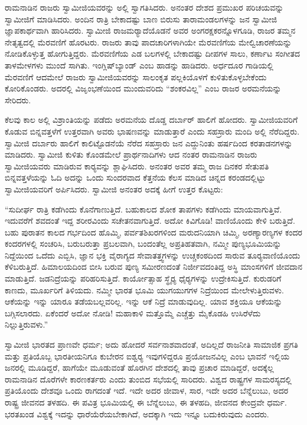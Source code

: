  ರಾಮನಾಡಿನ ರಾಜರು ಸ್ವಾಮೀಜಿಯವರನ್ನು ಅಲ್ಲಿ ಸ್ವಾಗತಿಸಿದರು. ಅನಂತರ ದೇಶದ ಪ್ರಮುಖರ ಪರಿಚಯವನ್ನು ಸ್ವಾಮೀಜಿಗೆ ಮಾಡಿಸಿದರು. ಅಂದಿನ ರಾತ್ರಿ ಬೇಕಾದಷ್ಟು ಬಾಣ ಬಿರುಸು ತಾರಾಮಂಡಲಗಳನ್ನು ಜನ ಸ್ವಾಮೀಜಿ ಜ್ಞಾಪಕಾರ್ಥವಾಗಿ ಹಾರಿಸಿದರು. ಸ್ವಾಮೀಜಿ ರಾಜಮರ‍್ಯಾದೆಯೊಡನೆ ಅವರ ಅಂಗರಕ್ಷಕರನ್ನೊಳಗೂಡಿ, ರಾಜರ ತಮ್ಮನ ನೇತೃತ್ವದಲ್ಲಿ ಮೆರವಣಿಗೆ ಹೊರಟರು. ರಾಜರು ತಾವು ಪಾದಚಾರಿಗಳಾಗಿಯೇ ಮೆರವಣಿಗೆಯ ಮೇಲ್ವಿಚಾರಣೆಯನ್ನು ನೋಡಿಕೊಳ್ಳುತ್ತ ಹೋಗುತ್ತಿದ್ದರು. ಮೆರವಣಿಗೆಯ ಎಡ ಬಲಗಳಲ್ಲಿ ಬೇಕಾದಷ್ಟು ದೀಪಗಳ ಸಾಲು, ಕರ್ಣಾಟ ಸಂಗೀತದ ತಾಳಮೇಳಗಳು ಮುಂದೆ ಸಾಗಿತು. ಇಂಗ್ಲಿಷ್‌ಬ್ಯಾಂಡ್  ಎಂಬ ಹಾಡನ್ನು ಹಾಡಿದರು. ಅರ್ಧದೂರ ಗಾಡಿಯಲ್ಲಿ ಮೆರವಣಿಗೆ ಆದಮೇಲೆ ರಾಜರು ಸ್ವಾಮೀಜಿಯವರನ್ನು ಸಾಲಂಕೃತ ಪಲ್ಲಕಿಯೊಳಗೆ ಕುಳಿತುಕೊಳ್ಳಬೇಕೆಂದು ಕೋರಿಕೊಂಡರು. ಅದರಲ್ಲಿ ವಿಜೃಂಭಣೆಯಿಂದ ಮುಂದುವರಿದು “ಶಂಕರವಿಲ್ಲ” ಎಂಬ ರಾಜರ ಅರಮನೆಯನ್ನು ಸೇರಿದರು. 

 ಕೆಲವು ಕಾಲ ಅಲ್ಲಿ ವಿಶ್ರಾಂತಿಯನ್ನು ಪಡೆದು ಅರಮನೆಯ ದೊಡ್ಡ ದರ್ಬಾರ್ ಹಾಲಿಗೆ ಹೋದರು. ಸ್ವಾಮೀಜಿಯವರಿಗೆ ಕೊಡುವ ಬಿನ್ನವತ್ತಳೆಗೆ ಉತ್ತರವಾಗಿ ಅವರು ಭಾಷಣವನ್ನು ಮಾಡುತ್ತಾರೆ ಎಂದು ಸಹಸ್ರಾರು ಮಂದಿ ಅಲ್ಲಿ ನೆರೆದಿದ್ದರು. ಸ್ವಾಮೀಜಿ ದರ್ಬಾರು ಹಾಲಿಗೆ ಕಾಲಿಟ್ಟೊಡನೆಯೆ ನೆರೆದ ಸಹಸ್ರಾರು ಜನ ಎದ್ದುನಿಂತು ಹರ್ಷದಿಂದ ಕರತಾಡನಗಳನ್ನು ಮಾಡಿದರು. ಸ್ವಾಮೀಜಿ ಕುಳಿತು ಕೊಂಡಮೇಲೆ ಪ್ರಾರ್ಥನಾದಿಗಳು ಆದ ನಂತರ ರಾಮನಾಡಿನ ರಾಜರು ಸ್ವಾಮೀಜಿಯವರು ಮಾಡಿರುವ ಕಾರ‍್ಯವನ್ನು ಶ್ಲಾಘಿಸಿದರು. ಅನಂತರ ಅವರ ತಮ್ಮ ರಾಜ ದಿನಕರ ಸೇತುಪತಿ ಬಿನ್ನವತ್ತಳೆಯನ್ನು ಓದಿ ಅದನ್ನು ಒಂದು ಸುಂದರವಾದ ಕೆತ್ತನೆಯ ಕೆಲಸ ಮಾಡಿದ ಚಿನ್ನದ ಕರಂಡದಲ್ಲಿಟ್ಟು ಸ್ವಾಮೀಜಿಯವರಿಗೆ ಅರ್ಪಿಸಿದರು. ಸ್ವಾಮೀಜಿ ಅನಂತರ ಅದಕ್ಕೆ ಹೀಗೆ ಉತ್ತರ ಕೊಟ್ಟರು: 

 “ಸುದೀರ್ಘ ರಾತ್ರಿ ಕಡೆಗಿಂದು ಕೊನೆಗಾಣುತ್ತಿದೆ. ಬಹುಕಾಲದ ಶೋಕ ತಾಪಗಳು ಕಡೆಗಿಂದು ಮಾಯವಾಗುತ್ತಿವೆ. ಇದುವರೆಗೆ ಶವದಂತೆ ಇದ್ದ ಶರೀರವಿಂದು ಸಚೇತನವಾಗುತ್ತಿದೆ. ಅದೋ ಕಿವಿಗೊಡಿ! ವಾಣಿಯೊಂದು ಕೇಳಿ ಬರುತ್ತಿದೆ. ಬಹು ಪುರಾತನ ಕಾಲದ ಗರ್ಭದಿಂದ ಹೊಮ್ಮಿ, ಪರ್ವತಶಿಖರಗಳಿಂದ ಮರುದನಿಯಾಗಿ ಚಿಮ್ಮಿ, ಅರಣ್ಯಾರಣ್ಯಗಳ ಕಂದರ ಕಂದರಗಳಲ್ಲಿ ಸಂಚರಿಸಿ, ಬರುಬರುತ್ತಾ ಪ್ರಬಲವಾಗಿ, ಬಂದಂತೆಲ್ಲ ಅಪ್ರತಿಹತವಾಗಿ, ನಮ್ಮೀ ಪುಣ್ಯಭೂಮಿಯನ್ನು ನಿದ್ದೆಯಿಂದ ಒದೆದು ಎಬ್ಬಿಸಿ, ಜ್ಞಾನ ಭಕ್ತಿ ವೈರಾಗ್ಯದ ಸೇವಾತತ್ತ್ವಗಳನ್ನು ಉಚ್ಚಕಂಠದಿಂದ ಸಾರುವ ತೂರ‍್ಯವಾಣಿಯೊಂದು ಕೆಳಿಬರುತ್ತಿದೆ. ಹಿಮಾಲಯದಿಂದ ಬೀಸಿ ಬರುವ ಪುಣ್ಯ ಸಮೀರಣದಂತೆ ನಿರ್ಜೀವದಂತಿದ್ದ ಅಸ್ಥಿ ಮಾಂಸಗಳಿಗೆ ಜೀವದಾನ ಮಾಡುತ್ತಿದೆ. ಜಡನಿದ್ರೆಯನ್ನು ಪರಿಹರಿಸುತ್ತಿದೆ. ಕಾರ್ಯೋತ್ಸಾಹ ಸ್ಥೈರ‍್ಯ ಧೈರ‍್ಯಗಳನ್ನು ಉದ್ರೇಕಿಸುತ್ತಿದೆ. ಕುರುಡರಿಗೆ ಕಾಣದು, ಮೂರ್ಖರಿಗೆ ತಿಳಿಯದು. ನಮ್ಮೀ ಭಾರತ ಭೂಮಿ ಯುಗಯುಗಗಳ ನಿದ್ರೆಯಿಂದ ಮೇಲೇಳುತ್ತಿರುವಳು. ಆಕೆಯನ್ನು ಇನ್ನು ಯಾರೂ ತಡೆಯಬಲ್ಲವರಿಲ್ಲ. ಇನ್ನು ಆಕೆ ನಿದ್ರೆ ಮಾಡುವುದಿಲ್ಲ. ಯಾವ ಶಕ್ತಿಯೂ ಆಕೆಯನ್ನು ಬಗ್ಗಿಸಲಾರದು. ಏಕೆಂದರೆ ಅದೋ ನೋಡಿ! ಮಹಾಕಾಳಿ ಮತ್ತೊಮ್ಮೆ ಎಚ್ಚೆತ್ತು ಮೈಕೊಡಹಿ ಉಸಿರೆಳೆದು ನಿಲ್ಲುತ್ತಿರುವಳು.” 

 ಸ್ವಾಮೀಜಿ ಭಾರತದ ಪ್ರಾಣವೇ ಧರ್ಮ; ಅದು ಹೋದರೆ ಸರ್ವನಾಶವಾದಂತೆ, ಅದಿಲ್ಲದೆ ರಾಜನೀತಿ ಸಾಮಾಜಿಕ ಪ್ರಗತಿ ಮತ್ತು ಪ್ರತಿಯೊಬ್ಬ ಭಾರತೀಯನಿಗೂ ಕುಬೇರನ ಐಶ್ವರ‍್ಯ ಇವುಗಳಿದ್ದರೂ ಪ್ರಯೋಜನವಿಲ್ಲ ಎಂಬ ಭಾವನೆ ಇಲ್ಲಿಯ ಜನರಲ್ಲಿ ಮೂಡಿದ್ದರೆ, ಹಾಗೆಯೇ ಮೂಡುವಂತೆ ಹೊರಗಿನ ದೇಶದಲ್ಲಿ ತಾವು ಪ್ರಚಾರ ಮಾಡಿದ್ದರೆ, ಅದಕ್ಕೆಲ್ಲ ರಾಮನಾಡಿನ ದೊರೆಗಳೇ ಕಾರಣಕರ್ತರು ಎಂದು ತುಂಬಿದ ಸಭೆಯಲ್ಲಿ ಸಾರಿದರು. ವಿಶ್ವದ ರಾಷ್ಟ್ರಗಳ ಸಾಮರಸ್ಯದಲ್ಲಿ ಪ್ರತಿಯೊಂದು ದೇಶವೂ ಒಂದು ರಾಗದಂತೆ ಇದೆ. ಇದೇ ಅದರ ಜೀವಾಳ, ಸಾರ, ಇದೇ ಅದರ ಬೆನ್ನೆಲುಬು, ಅದರ ರಾಷ್ಟ್ರ ಜೀವನದ ತಳಹದಿ. ಈ ಪವಿತ್ರ ಭೂಮಿಯಲ್ಲಿ ಈ ಬೆನ್ನೆಲುಬು, ಈ ತಳಹದಿ, ಜೀವನದ ಕೇಂದ್ರವೇ ಧರ್ಮ. ಭರತಖಂಡ ವಿಶ್ವಕ್ಕೆ ಇದನ್ನು ಧಾರೆಯೆರೆಯಬೇಕಾಗಿದೆ, ಅದಕ್ಕಾಗಿ ಇದು ಇನ್ನೂ ಬದುಕಿರುವುದು ಎಂದರು. 

